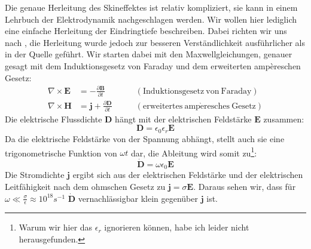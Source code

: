 Die genaue Herleitung des Skineffektes ist relativ kompliziert, sie kann in einem Lehrbuch der Elektrodynamik nachgeschlagen werden. %
Wir wollen hier lediglich eine einfache Herleitung der Eindringtiefe beschreiben. Dabei richten wir uns nach \cite{Gerthsen}, die Herleitung wurde jedoch zur besseren Verständlichkeit ausführlicher als in der Quelle geführt.
Wir starten dabei mit den Maxwellgleichungen, genauer gesagt mit dem Induktionsgesetz von Faraday und dem erweiterten ampèreschen Gesetz:
\begin{align}
\nabla \times \mathbf{E} &= -\frac{\partial \mathbf{B}}{\partial t} \qquad &\mathrm{(Induktionsgesetz\ von\ Faraday)} \\
\nabla \times \mathbf{H} &= \mathbf{j} + \frac{\partial \mathbf{D}}{\partial t} \qquad &\mathrm{(erweitertes\ amp\grave{e}resches\ Gesetz)}
\end{align}
Die elektrische Flussdichte $\mathbf{D}$ hängt mit der elektrischen Feldstärke $\mathbf{E}$ zusammen:
\begin{equation}
\mathbf D = \epsilon_0 \epsilon_r \mathbf{E}
\end{equation}
Da die elektrische Feldstärke von der Spannung abhängt, stellt auch sie eine trigonometrische Funktion von $\omega t$ dar, die Ableitung wird somit zu\footnote{Warum wir hier das $\epsilon_r$ ignorieren können, habe ich leider nicht herausgefunden.}:
\begin{equation}
\mathbf{\dot{D}} = \omega \epsilon_0 \mathbf{E}
\end{equation}
Die Stromdichte $\mathbf{j}$ ergibt sich aus der elektrischen Feldstärke und der elektrischen Leitfähigkeit nach dem ohmschen Gesetz zu $\mathbf{j} = \sigma \mathbf E$. Daraus sehen wir, dass für $\omega \ll \frac{\sigma}{\epsilon} \approx 10^{18} s^{-1}$ $\mathbf{\dot{D}}$ vernachlässigbar klein gegenüber $\mathbf{j}$ ist.

